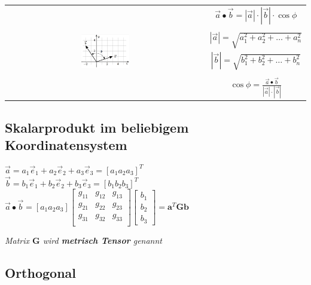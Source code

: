 \begin{tabular}{cc}
    \multirow{6}{*}{
        \includegraphics[width=0.25\textwidth]{assets/skaparprodukt.png}
    }
     & $\vec{a} \bullet \vec{b} = |\vec{a}| \cdot |\vec{b}| \cdot \cos \phi$ \\
     & \\
     & $|\vec{a}| = \sqrt{a_1^2 + a_2^2 + \dots + a_n^2}$ \\
     & $|\vec{b}| = \sqrt{b_1^2 + b_2^2 + \dots + b_n^2}$ \\
     & \\
     & $\cos \phi = \frac{\vec{a} \bullet \vec{b}}{|\vec{a}| \cdot |\vec{b}|}$ \\
\end{tabular}

\subsection{Skalarprodukt im beliebigem Koordinatensystem}

$\vec{a} = a_1\vec{e}_1 + a_2\vec{e}_2 + a_3\vec{e}_3 = [a_1 a_2 a_3]^T$ \\
$\vec{b} = b_1\vec{e}_1 + b_2\vec{e}_2 + b_3\vec{e}_3 = [b_1 b_2 b_3]^T$ \\

$\vec{a} \bullet \vec{b} = [a_1 a_2 a_3]\begin{bmatrix}
    g_{11} & g_{12} & g_{13} \\
    g_{21} & g_{22} & g_{23} \\
    g_{31} & g_{32} & g_{33} \\
\end{bmatrix} \begin{bmatrix}
    b_1 \\
    b_2 \\
    b_3
\end{bmatrix} = \mathbf{a}^T \mathbf{G} \mathbf{b}$

\textit{Matrix $\mathbf{G}$ wird \textbf{metrisch Tensor} genannt}

\subsection{Orthogonal}

